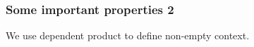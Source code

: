 \documentclass[12pt, mathserif,handout]{beamer}
\begin{document}
\begin{frame}

\frametitle{Some important properties 2}

We use dependent product to define non-empty context.
\small
\begin{code}\>\<%
\\
\> \AgdaSymbol{=}   \<%
\\
%
\\
\> \AgdaSymbol{:}   \<%
\\
\> \AgdaSymbol{=} \<%
\\
%
\\
\> \AgdaSymbol{:}   \<%
\\
\> \AgdaSymbol{=}  \AgdaInductiveConstructor{\_,\_}\<%
\\
%
\\
\> \AgdaSymbol{:} \AgdaSymbol{(} \AgdaSymbol{:} \AgdaSymbol{)}   \AgdaSymbol{(} \AgdaSymbol{)}\<%
\\
\> \<[8]%
\>[8]\AgdaSymbol{=} \<%
\\
%
\\
\> \AgdaSymbol{:} \AgdaSymbol{(} \AgdaSymbol{:} \AgdaSymbol{)}     \<%
\\
\> \AgdaSymbol{(\_} \AgdaInductiveConstructor{,,} \AgdaSymbol{)} \AgdaSymbol{=}   \<%
\\
\>\<\end{code}

\end{frame}
\end{document}
